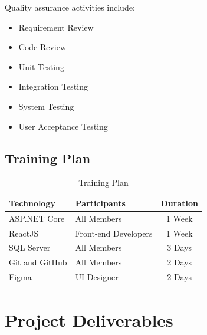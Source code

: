 Quality assurance activities include:

\begin{itemize}
\item Requirement Review
\item Code Review
\item Unit Testing
\item Integration Testing
\item System Testing
\item User Acceptance Testing
\end{itemize}

\subsection{Training Plan}

\begin{table}[H]
\centering
\caption{Training Plan}
\label{tab:training}

\begin{tabular}{|l|l|c|}
\hline
\textbf{Technology} & \textbf{Participants} & \textbf{Duration}\\
\hline
ASP.NET Core & All Members & 1 Week\\
\hline
ReactJS & Front-end Developers & 1 Week\\
\hline
SQL Server & All Members & 3 Days\\
\hline
Git and GitHub & All Members & 2 Days\\
\hline
Figma & UI Designer & 2 Days\\
\hline
\end{tabular}
\end{table}


\section{Project Deliverables}

